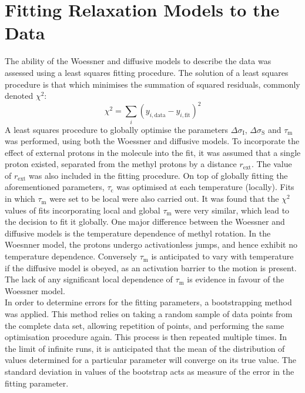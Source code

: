 \section{Fitting Relaxation Models to the Data}
The ability of the Woessner and diffusive models to describe the data was assessed using a least squares fitting procedure. The solution of a least squares procedure is that which minimises the summation of squared residuals, commonly denoted $\chi^2$:
\begin{equation}
\chi^2 = \sum \limits_i (y_{i,\text{data}} - y_{i,\text{fit}})^2
\end{equation}
A least squares procedure to globally optimise the parameters $\Delta \sigma_{\text{I}}$, $\Delta \sigma_{\text{S}}$ and $\tau_{\text{m}}$ was performed, using both the Woessner and diffusive models. To incorporate the effect of external protons in the molecule into the fit, it was assumed that a single proton existed, separated from the methyl protons by a distance $r_{\text{ext}}$. The value of $r_{\text{ext}}$ was also included in the fitting procedure. On top of globally fitting the aforementioned parameters, $\tau_{\text{c}}$ was optimised at each temperature (locally). Fits in which $\tau_{\text{m}}$ were set to be local were also carried out. It was found that the $\chi^2$ values of fits incorporating local and global $\tau_{\text{m}}$ were very similar, which lead to the decision to fit it globally. One major difference between the Woessner and diffusive models is the temperature dependence of methyl rotation. In the Woesnner model, the protons undergo activationless jumps, and hence exhibit no temperature dependence. Conversely $\tau_{\text{m}}$ is anticipated to vary with temperature if the diffusive model is obeyed, as an activation barrier to the motion is present. The lack of any significant local dependence of $\tau_{\text{m}}$ is evidence in favour of the Woessner model.\\
In order to determine errors for the fitting parameters, a bootstrapping method was applied. This method relies on taking a random sample of data points from the complete data set, allowing repetition of points, and performing the same optimisation procedure again. This process is then repeated multiple times. In the limit of infinite runs, it is anticipated that the mean of the distribution of values determined for a particular parameter will converge on its true value. The standard deviation in values of the bootstrap acts as measure of the error in the fitting parameter.
